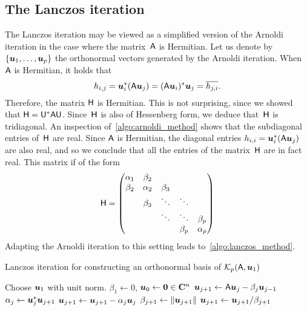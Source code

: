 \subsection{The Lanczos iteration}
The Lanczos iteration may be viewed as a simplified version of the Arnoldi iteration in the case where the matrix~$\mathsf A$ is Hermitian.
Let us denote by $\{ \mathbf{\boldsymbol{u}}_1, \dotsc, \mathbf{\boldsymbol{u}}_p \}$ the orthonormal vectors generated by the Arnoldi iteration.
When~$\mathsf A$ is Hermitian, it holds that
\[
    h_{i,j} = \mathbf{\boldsymbol{u}}_{i}^* (\mathsf A \mathbf{\boldsymbol{u}}_{j}) = (\mathsf A \mathbf{\boldsymbol{u}}_i)^* \mathbf{\boldsymbol{u}}_j = \overline{h_{j,i}}.
\]
Therefore, the matrix $\mathsf H$ is Hermitian.
This is not surprising, since we showed that $\mathsf H = \mathsf U^* \mathsf A \mathsf U$.
Since~$\mathsf H$ is also of Hessenberg form,
we deduce that~$\mathsf H$ is tridiagonal.
An inspection of~\cref{algo:arnoldi_method} shows that the subdiagonal entries of~$\mathsf H$ are real.
Since $\mathsf A$ is Hermitian, the diagonal entries $h_{i,i} = \mathbf{\boldsymbol{u}}_{i}^* (\mathsf A \mathbf{\boldsymbol{u}}_{j})$ are also real,
and so we conclude that all the entries of the matrix~$\mathsf H$ are in fact real.
This matrix if of the form
\[
    \mathsf H
    =
    \begin{pmatrix}
        \alpha_1 & \beta_2 \\
        \beta_2 & \alpha_2 & \beta_3 \\
            & \beta_3 & \ddots & \ddots \\
            & & \ddots & \ddots & \beta_p \\
            & & & \beta_p & \alpha_p
    \end{pmatrix}
\]
Adapting the Arnoldi iteration to this setting leads to~\cref{algo:lanczos_method}.
\begin{algorithm}
\caption{Lanczos iteration for constructing an orthonormal basis of $\mathcal K_p(\mathsf A, \mathbf{\boldsymbol{u}}_1)$}%
\label{algo:lanczos_method}%
\begin{algorithmic}
\State Choose $\mathbf{\boldsymbol{u}}_1$ with unit norm.
\State $\beta_1 \gets 0$, $\mathbf{\boldsymbol{u}}_0 \gets \mathbf{\boldsymbol{0}} \in \mathbf C^n$
    \State $\mathbf{\boldsymbol{u}}_{j+1} \gets \mathsf A \mathbf{\boldsymbol{u}}_{j} - \beta_j \mathbf{\boldsymbol{u}}_{j-1}$
    \State $\alpha_j \gets \mathbf{\boldsymbol{u}}_{j}^* \mathbf{\boldsymbol{u}}_{j+1}$
    \State $\mathbf{\boldsymbol{u}}_{j+1} \gets \mathbf{\boldsymbol{u}}_{j+1} - \alpha_j \mathbf{\boldsymbol{u}}_{j}$
    \State $\beta_{j+1} \gets \lVert\mathbf{\boldsymbol{u}}_{j+1}\rVert$
    \State $\mathbf{\boldsymbol{u}}_{j+1} \gets \mathbf{\boldsymbol{u}}_{j+1} / \beta_{j+1}$
\EndFor
\end{algorithmic}
\end{algorithm}

